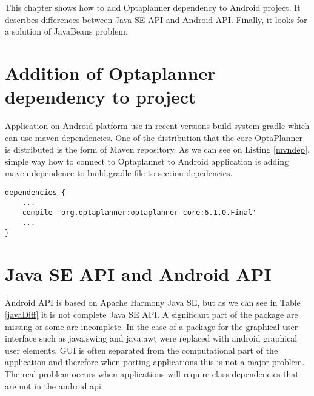 This chapter shows how to add Optaplanner dependency to Android project. It describes differences between Java SE API and Android API. Finally, it looks for a solution of JavaBeans problem. 

\section{Addition of Optaplanner dependency to project}
Application on Android platform use in recent versions build system gradle which can use maven dependencies. One of the distribution that the core OptaPlanner is distributed is the form of Maven repository. As we can see on Listing \ref{mvndep}, simple way how to connect to Optaplannet to Android application is adding maven dependence to build.gradle file to section depedencies.
\\
\begin{lstlisting}[captionpos={b},caption={Maven Optaplanner dependency.},frame={lines},label={mvndep},basicstyle=\footnotesize]
dependencies {
    ...
    compile 'org.optaplanner:optaplanner-core:6.1.0.Final'
    ...
}
\end{lstlisting}

\section{Java SE API and Android API}\label{apis}
Android API is based on Apache Harmony Java SE, but as we can see in Table \ref{javaDiff} it is not complete Java SE API. A significant part of the package are missing or some are incomplete. In the case of a package for the graphical user interface such as java.swing and java.awt were replaced with android graphical user elements. GUI is often separated from the computational part of the application and therefore when porting applications this is not a major problem. The real problem occurs when applications will require class dependencies that are not in the android api

